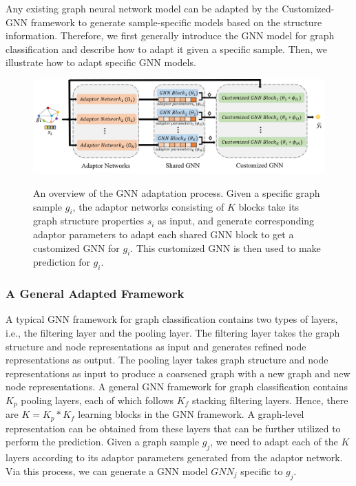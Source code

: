 \documentclass[11pt,dvipdfm]{article}
\begin{document}
Any existing graph neural network model can be adapted by the Customized-GNN framework to generate sample-specific models based on the structure information. Therefore, we first generally introduce the GNN model for graph classification and describe how to adapt it given a specific sample. Then, we illustrate how to adapt specific GNN models. 
\begin{figure}[!t]
\begin{center}
{\includegraphics[width=1\linewidth]{submissions/Yiqi2023/figs/adaptation-frame.png}}%

\end{center}

\caption{An overview of the GNN adaptation process. Given a specific graph sample $g_i$, the adaptor networks consisting of $K$ blocks take its graph structure properties $s_i$ as input, and generate corresponding adaptor parameters to adapt each shared GNN block to get a customized GNN for $g_i$. This customized GNN is then used to make prediction for $g_i$.}

\label{fig:adaptor-frame}

\end{figure}
\subsubsection{A General Adapted Framework}

A typical GNN framework for graph classification contains two types of layers, i.e., the filtering layer and the pooling layer. The filtering layer takes the graph structure and node representations as input and generates refined node representations as output. The pooling layer takes graph structure and node representations as input to produce a coarsened graph with a new graph and new node representations. A general GNN framework for graph classification contains $K_p$ pooling layers, each of which follows $K_f$ stacking filtering layers. Hence, there are $K=K_p*K_f$ learning blocks in the GNN framework. A graph-level representation can be obtained from these layers that can be further utilized to perform the prediction. Given a graph sample $g_j$, we need to adapt each of the $K$ layers according to its adaptor parameters generated from the adaptor network. Via this process, we can generate a GNN model $GNN_j$ specific to $g_j$.
\end{document}
